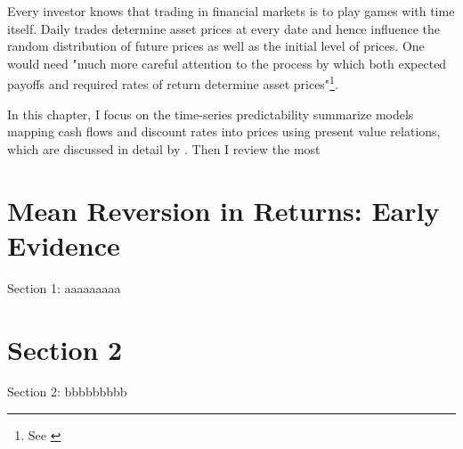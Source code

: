 \minitoc

\vspace{0.5cm}
Every investor knows that trading in financial markets is to play
games with time itself. Daily trades determine asset prices at every date and hence
influence the random distribution of future prices as well as the initial
level of prices. One would need "much more careful attention to the process
by which both expected payoffs and required rates of return determine
asset prices"\footnote{See \cite[p.~121]{campbell2017financial}}.

In this chapter, I focus on the time-series predictability summarize models 
mapping cash flows and discount rates into prices using present value relations, 
which are discussed in detail by
\citet[Chapter~5]{campbell2017financial}. Then I review the most  

\section{Mean Reversion in Returns: Early Evidence}
Section 1: aaaaaaaaa

\section{Section 2}
Section 2: bbbbbbbbb